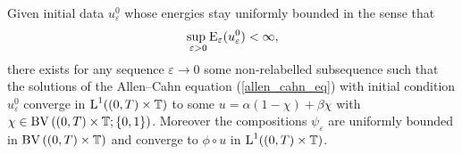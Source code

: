 \begin{proposition}
	\label{initial_convergence_result}
	Given initial data $ u_{ \varepsilon }^{ 0 } $ whose energies stay uniformly bounded in the sense that
	\begin{equation}
		\sup_{ \ \varepsilon > 0 }
			\operatorname{E}_{ \varepsilon } ( u_{ \varepsilon }^{ 0 } ) 
		< 
		\infty,
	\end{equation}
	there exists for any sequence $ \varepsilon \to 0 $ some non-relabelled subsequence such that the solutions of the Allen--Cahn equation (\ref{allen_cahn_eq}) with initial condition $ u_{ \varepsilon }^{ 0 } $ converge in $ \operatorname{L}^{ 1 } ( ( 0, T ) \times \operatorname{\mathbb{T}} ) $ to some $ u = \alpha ( 1 - \chi ) + \beta \chi $ with $ \chi \in \operatorname{BV} \left( ( 0 , T ) \times \operatorname{\mathbb{T}} ; \{ 0 , 1 \} \right) $. Moreover the compositions $ \psi_{ \varepsilon } $ are uniformly bounded in $ \operatorname{BV} \left( ( 0, T ) \times \operatorname{\mathbb{T}} \right) $ and converge to $ \phi \circ u $ in $ \operatorname{L}^{ 1 } ( ( 0 , T ) \times \operatorname{\mathbb{T}} ) $.
\end{proposition}

